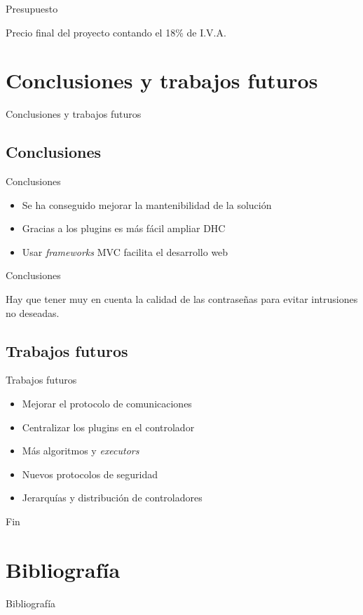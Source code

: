 \documentclass[12pt]{beamer}
\newcommand{\mysection}[1]{\begin{frame}{}\begin{center}\Huge #1\end{center}\end{frame}}
\begin{document}
\begin{frame}{Presupuesto}
	\begin{center}
		Precio final del proyecto contando el 18\% de I.V.A.
		\pause
		\only<2>{\Huge 43.785,30\euro}
	\end{center}
\end{frame}


\section{Conclusiones y trabajos futuros}
\mysection{Conclusiones y trabajos futuros}

\subsection{Conclusiones}
\begin{frame}{Conclusiones}
	\begin{itemize}
		\item Se ha conseguido mejorar la mantenibilidad de la solución
		\item Gracias a los plugins es más fácil ampliar DHC
		\item Usar \emph{frameworks} MVC facilita el desarrollo web
	\end{itemize}
\end{frame}

\begin{frame}{Conclusiones}
	\begin{center}
		Hay que tener muy en cuenta la calidad de las contraseñas para evitar intrusiones no deseadas.
	\end{center}
\end{frame}

\subsection{Trabajos futuros}
\begin{frame}{Trabajos futuros}
	\begin{itemize}
		\item Mejorar el protocolo de comunicaciones
		\item Centralizar los plugins en el controlador
		\item Más algoritmos y \emph{executors}
		\item Nuevos protocolos de seguridad
		\item Jerarquías y distribución de controladores
	\end{itemize}
\end{frame}

\begin{frame}
	\begin{center}
		\Huge Fin
	\end{center}
\end{frame}

\section{Bibliografía}
\begin{frame}[allowframebreaks]{Bibliografía}
	
	
\end{frame}
\end{document}
